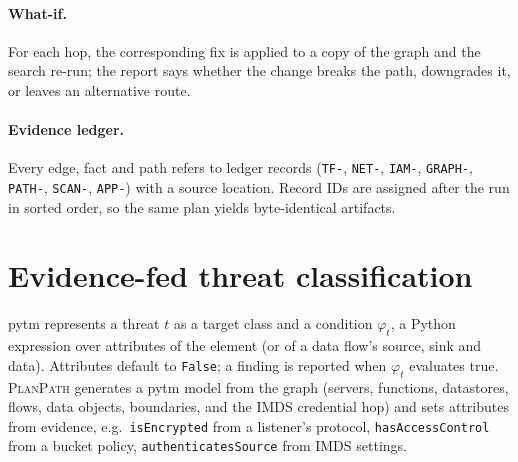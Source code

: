 \documentclass[sigconf,review,anonymous]{acmart}
\newcommand{\sys}{\textsc{PlanPath}\xspace}   %
\begin{document}
\paragraph{What-if.} For each hop, the corresponding fix is applied to a copy of the graph and the search re-run; the report
says whether the change breaks the path, downgrades it, or leaves an alternative route.

\paragraph{Evidence ledger.} Every edge, fact and path refers to ledger records (\texttt{TF-}, \texttt{NET-}, \texttt{IAM-},
\texttt{GRAPH-}, \texttt{PATH-}, \texttt{SCAN-}, \texttt{APP-}) with a source location. Record IDs are assigned after the run in
sorted order, so the same plan yields byte-identical artifacts.

\section{Evidence-fed threat classification}\label{sec:classify}

pytm represents a threat $t$ as a target class and a condition $\varphi_t$, a Python expression over attributes of the element
(or of a data flow's source, sink and data). Attributes default to \texttt{False}; a finding is reported when $\varphi_t$
evaluates true. \sys generates a pytm model from the graph (servers, functions, datastores, flows, data objects, boundaries,
and the IMDS credential hop) and sets attributes from evidence, e.g.\ \texttt{isEncrypted} from a listener's protocol,
\texttt{hasAccessControl} from a bucket policy, \texttt{authenticatesSource} from IMDS settings.
\end{document}
